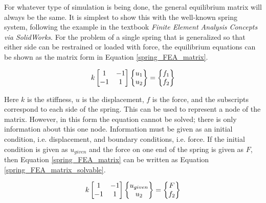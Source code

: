 For whatever type of simulation is being done, the general equilibrium matrix will always be the same. It is simplest to show this with the well-known spring system, following the example in the textbook \textit{Finite Element Analysis Concepts via SolidWorks}. For the problem of a single spring that is generalized so that either side can be restrained or loaded with force, the equilibrium equations can be shown as the matrix form in Equation \ref{spring_FEA_matrix}.

\begin{equation} \label{spring_FEA_matrix}
\begingroup
    k
    \begin{bmatrix}
        1 & -1 \\
        -1 & 1
    \end{bmatrix}
    \begin{Bmatrix}
        u_1 \\
        u_2 \\
    \end{Bmatrix}
    =
    \begin{Bmatrix}
        f_1 \\
        f_2 \\
    \end{Bmatrix}
\endgroup
\end{equation}

Here $k$ is the stiffness, $u$ is the displacement, $f$ is the force, and the subscripts correspond to each side of the spring. This can be used to represent a node of the matrix. However, in this form the equation cannot be solved; there is only information about this one node. Information must be given as an initial condition, i.e. displacement, and boundary conditions, i.e. force. If the initial condition is given as $u_{given}$ and the force on one end of the spring is given as $F$, then Equation \ref{spring_FEA_matrix} can be written as Equation \ref{spring_FEA_matrix_solvable}.

\begin{equation} \label{spring_FEA_matrix_solvable}
\begingroup
    k
    \begin{bmatrix}
        1 & -1 \\
        -1 & 1
    \end{bmatrix}
    \begin{Bmatrix}
        u_{given} \\
        u_2 \\
    \end{Bmatrix}
    =
    \begin{Bmatrix}
        F \\
        f_2 \\
    \end{Bmatrix}
\endgroup
\end{equation}

